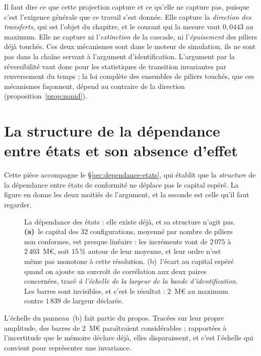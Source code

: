 Il faut dire ce que cette projection capture et ce qu'elle ne capture pas, puisque c'est l'exigence
générale que ce travail s'est donnée. Elle capture la \emph{direction des transferts}, qui est
l'objet du chapitre, et le courant qui la mesure vaut $0{,}0443$ au maximum. Elle ne capture ni
l'\emph{extinction} de la cascade, ni l'\emph{épuisement} des piliers déjà touchés. Ces deux
mécanismes sont dans le moteur de simulation, ils ne sont pas dans la chaîne servant à l'argument
d'identification. L'argument par la réversibilité vaut donc pour les statistiques de transition
invariantes par renversement du temps ; la loi complète des ensembles de piliers touchés, que ces
mécanismes façonnent, dépend au contraire de la direction (proposition~\ref{prop:nonid}).

\section{La structure de la dépendance entre états et son absence d'effet}
\label{sec:ann-dependance-etats}


Cette pièce accompagne le \S\ref{sec:dependance-etats}, qui établit que la \emph{structure} de la
dépendance entre états de conformité ne déplace pas le capital espéré. La figure en donne les
deux moitiés de l'argument, et la seconde est celle qu'il faut regarder.

\begin{figure}[htbp]\centering
{}
\caption{La dépendance des états : elle existe déjà, et sa structure n'agit pas.
\textbf{(a)}~le capital des $32$ configurations, moyenné par nombre de piliers non conformes,
est presque linéaire : les incréments vont de $2\,075$ à $2\,403$~M\euro, soit $15\,\%$ autour de
leur moyenne, et leur ordre n'est même pas monotone à cette résolution. (b)~l'écart au
capital espéré quand on ajoute un surcroît de corrélation aux deux paires concernées, tracé
\emph{à l'échelle de la largeur de la bande d'identification}. Les barres sont invisibles, et
c'est le résultat : $2$~M\euro{} au maximum contre $1\,839$ de largeur déclarée.}
\label{fig:dependance-etats}
\end{figure}

\noindent L'échelle du panneau~(b) fait partie du propos. Tracées sur leur propre amplitude, des
barres de $2$~M\euro{} paraîtraient considérables ; rapportées à l'incertitude que le mémoire
déclare déjà, elles disparaissent, et c'est l'échelle qui convient pour représenter une
invariance.

